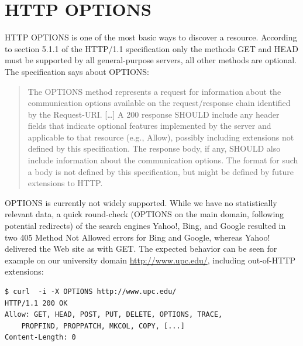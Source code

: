 \documentclass{acm_proc_article-sp}
\begin{document}
\section{HTTP OPTIONS}\label{sec:httpoptions}
HTTP OPTIONS is one of the most basic ways to discover a resource. According to section 5.1.1 of the HTTP/1.1 specification\cite{HTTP:Spec} only the methods GET and HEAD must be supported by all general-purpose servers, all other methods are optional. The specification says about OPTIONS:
\begin{quote}
The OPTIONS method represents a request for information about the communication options available on the request/response chain identified by the Request-URI. [\ldots] A 200 response SHOULD include any header fields that indicate optional features implemented by the server and applicable to that resource (e.g., Allow), possibly including extensions not defined by this specification. The response body, if any, SHOULD also include information about the communication options. The format for such a body is not defined by this specification, but might be defined by future extensions to HTTP.
\end{quote}
OPTIONS is currently not widely supported. While we have no statistically relevant data, a quick round-check (OPTIONS on the main domain, following potential redirects) of the search engines Yahoo!, Bing, and Google resulted in two 405 Method Not Allowed errors for Bing and Google, whereas Yahoo! delivered the Web site as with GET. The expected behavior can be seen for example on our university domain \url{http://www.upc.edu/}, including out-of-HTTP extensions:
\begin{verbatim}
$ curl  -i -X OPTIONS http://www.upc.edu/
HTTP/1.1 200 OK
Allow: GET, HEAD, POST, PUT, DELETE, OPTIONS, TRACE,
    PROPFIND, PROPPATCH, MKCOL, COPY, [...]
Content-Length: 0
\end{verbatim}
\end{document}

